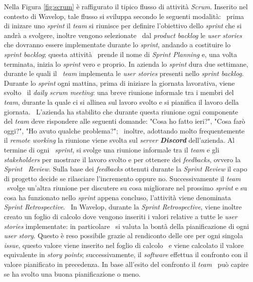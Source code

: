 Nella Figura \ref{fig:scrum} è raffigurato il tipico flusso di attività \emph{Scrum}. Inserito nel contesto di Wavelop, tale flusso si sviluppa secondo le seguenti modalità: \
prima di inizare uno \emph{sprint} il \emph{team} si riunisce per definire l'obiettivo dello \emph{sprint} che si andrà a svolgere, inoltre vengono selezionate \
dal \emph{product backlog} le \emph{user stories} che dovranno essere implementate durante lo \emph{sprint}, andando a costituire lo \emph{sprint backlog}; questa attività \
prende il nome di \emph{Sprint Planning} e, una volta terminata, inizia lo \emph{sprint} vero e proprio. In azienda lo \emph{sprint} dura due settimane, durante le quali il \
\emph{team} implementa le \emph{user stories} presenti nello \emph{sprint backlog}. Durante lo \emph{sprint} ogni mattina, prima di iniziare la giornata lavorativa, viene svolto \
il \emph{daily scrum meeting}: una breve riunione informale tra i membri del \emph{team}, durante la quale ci si allinea sul lavoro svolto e si pianifica il lavoro della giornata. \
L'azienda ha stabilito che durante questa riunione ogni componente del \emph{team} deve rispondere alle seguenti domande: "Cosa ho fatto ieri?", "Cosa farò oggi?", "Ho avuto qualche problema?"; \
inoltre, adottando molto frequentemente il \emph{remote working} la riunione viene svolta sul \emph{server \textbf{Discord}} dell'azienda. Al termine di ogni \
\emph{sprint}, si svolge una riunione informale tra il \emph{team} e gli \emph{\glspl{stakeholder}} per mostrare il lavoro svolto e per ottenere dei \emph{feedbacks}, ovvero la \emph{Sprint \
Review}. Sulla base dei \emph{feedbacks} ottenuti durante la \emph{Sprint Review} il capo di progetto decide se rilasciare l'incremento oppure no. Successivamente il \emph{team} \
svolge un'altra riunione per discutere su cosa migliorare nel prossimo \emph{sprint} e su cosa ha funzionato nello \emph{sprint} appena concluso, l'attività viene denominata \emph{Sprint Retrospective}. \
In Wavelop, durante la \emph{Sprint Retrospective}, viene inoltre creato un foglio di calcolo dove vengono inseriti i valori relative a tutte le \emph{user stories} implementate: in particolare \
si valuta la bontà della pianificazione di ogni \emph{user story}. Questo è reso possibile grazie al rendiconto delle ore per ogni singola \emph{issue}, questo valore viene inserito nel foglio di calcolo \
e viene calcolato il valore equivalente in \emph{story points}; successivamente, il \emph{software} effettua il confronto con il valore pianificato in precedenza. In base all'esito del confronto il \emph{team} \
può capire se ha svolto una buona pianificazione o meno.

